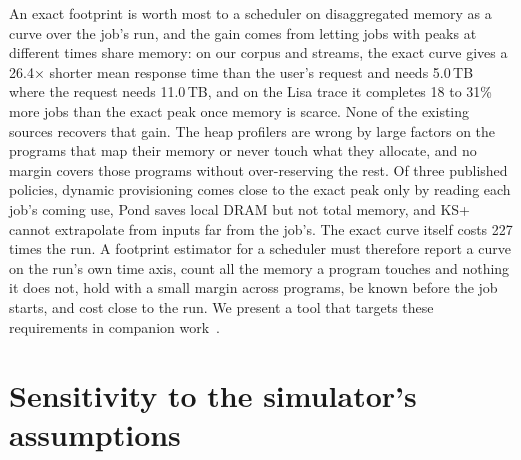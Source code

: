 \documentclass[11pt]{article}
\begin{document}
An exact footprint is worth most to a scheduler on disaggregated memory as a curve over the job's run, and the gain comes from
letting jobs with peaks at different times share memory: on our corpus and streams, the exact curve gives a 26.4$\times$
shorter mean response time than the user's request and needs 5.0\,TB where the request needs 11.0\,TB, and on the Lisa trace it
completes 18 to 31\% more jobs than the exact peak once memory is scarce. None of the existing sources recovers that gain. The
heap profilers are wrong by large factors on the programs that map their memory or never touch what they allocate, and no
margin covers those programs without over-reserving the rest. Of three published policies, dynamic provisioning comes close
to the exact peak only by reading each job's coming use, Pond saves local DRAM but not total memory, and KS+ cannot
extrapolate from inputs far from the job's. The exact curve itself costs 227 times the run. A footprint estimator for a
scheduler must therefore report a curve on the run's own time axis, count all the memory a program touches and nothing it
does not, hold with a small margin across programs, be known before the job starts, and cost close to the run. We present a
tool that targets these requirements in companion work~\cite{memprint}.

\appendix

\section{Sensitivity to the simulator's assumptions}
\label{sec:sensitivity}

\begin{table}[h]
\centering
\caption{Mean response time (minutes) at offered load 0.8 as the remote-memory slowdown $\beta$ varies (default 0.5),
calibrated 90\% margins, mean of three seeds.}
\resizebox{\textwidth}{!}{}
\end{table}

\begin{table}[h]
\centering
\caption{Mean response time (minutes) at offered load 0.8 as the pool varies (default 1\,TB).}
\resizebox{\textwidth}{!}{}
\end{table}

\begin{table}[h]
\centering
\caption{Mean response time (minutes) at offered load 0.8 as the update interval of the policies that resize a running job
varies (default 5 minutes).}

\end{table}
\end{document}
